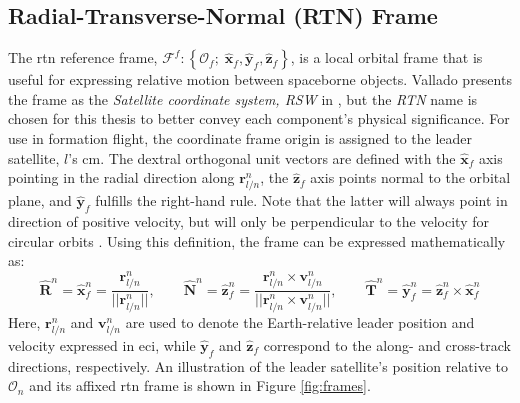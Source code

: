 \subsection{Radial-Transverse-Normal (RTN) Frame}
The \gls{rtn} reference frame, $\mathcal{F}^{f}: \left\{ \mathcal{O}_{f}; \; \hat{\textbf{x}}_{f}, \hat{\textbf{y}}_{f}, \hat{\textbf{z}}_{f} \right\}$, is a local orbital frame that is useful for expressing relative motion between spaceborne objects. Vallado presents the frame as the \textit{Satellite coordinate system, RSW} in \cite{vallado2001fundamentals}, but the \textit{RTN} name is chosen for this thesis to better convey each component's physical significance. For use in formation flight, the coordinate frame origin is assigned to the leader satellite, $l$'s \gls{cm}. The dextral orthogonal unit vectors are defined with the $\hat{\textbf{x}}_f$ axis pointing in the radial direction along $\textbf{r}^n_{l/n}$, the $\hat{\textbf{z}}_f$ axis points normal to the orbital plane, and $\hat{\textbf{y}}_f$ fulfills the right-hand rule. Note that the latter will always point in direction of positive velocity, but will only be perpendicular to the velocity for circular orbits \cite{vallado2001fundamentals, stratton2025rtn}. Using this definition, the frame can be expressed mathematically as:
\begin{equation}
    \hat{\textbf{R}}^n = \hat{\textbf{x}}_f^n = \frac{\textbf{r}^n_{l/n}}{||\textbf{r}^n_{l/n}||}, \qquad \hat{\textbf{N}}^n = \hat{\textbf{z}}_f^n = \frac{\textbf{r}^n_{l/n} \times \textbf{v}^n_{l/n}}{||\textbf{r}^n_{l/n} \times \textbf{v}^n_{l/n}||}, \qquad \hat{\textbf{T}}^n = \hat{\textbf{y}}_f^n = \hat{\textbf{z}}^n_f \times \hat{\textbf{x}}_f^n
\end{equation}
Here, $\textbf{r}^n_{l/n}$ and $\textbf{v}^n_{l/n}$ are used to denote the Earth-relative leader position and velocity expressed in \gls{eci}, while $\hat{\textbf{y}}_f$ and $\hat{\textbf{z}}_f$ correspond to the along- and cross-track directions, respectively. An illustration of the leader satellite's position relative to $\mathcal{O}_n$ and its affixed \gls{rtn} frame is shown in Figure \ref{fig:frames}.



